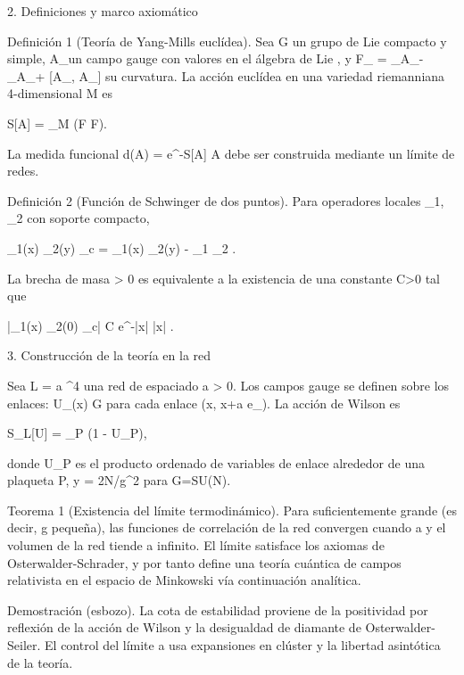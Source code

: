 \documentclass[12pt,a4paper]{book}
\begin{document}
2. Definiciones y marco axiomático

Definición 1 (Teoría de Yang-Mills euclídea). Sea G un grupo de Lie compacto y simple, A_\mu un campo gauge con valores en el álgebra de Lie , y F_{\mu\nu} = \partial_\mu A_\nu - \partial_\nu A_\mu + [A_\mu, A_\nu] su curvatura. La acción euclídea en una variedad riemanniana 4-dimensional M es

S[A] =  \int_M (F \wedge *F).

La medida funcional d\mu(A) = e^{-S[A]} A debe ser construida mediante un límite de redes.

Definición 2 (Función de Schwinger de dos puntos). Para operadores locales _1, _2 con soporte compacto,

\langle {}_1(x) _2(y) \rangle_c = \langle {}_1(x) _2(y) \rangle - \langle {}_1 \rangle \langle {}_2 \rangle.

La brecha de masa \Delta > 0 es equivalente a la existencia de una constante C>0 tal que

|\langle {}_1(x) _2(0) \rangle_c| \le C e^{-\Delta |x|} \quad {} |x| \to \infty.

3. Construcción de la teoría en la red

Sea L = a ^4 una red de espaciado a > 0. Los campos gauge se definen sobre los enlaces: U_\mu(x) \in G para cada enlace (x, x+a e_\mu). La acción de Wilson es

S_L[U] = \beta \sum_P  (1 - U_P),

donde U_P es el producto ordenado de variables de enlace alrededor de una plaqueta P, y \beta = 2N/g^2 para G=SU(N).

Teorema 1 (Existencia del límite termodinámico). Para \beta suficientemente grande (es decir, g pequeña), las funciones de correlación de la red convergen cuando a  y el volumen de la red tiende a infinito. El límite satisface los axiomas de Osterwalder-Schrader, y por tanto define una teoría cuántica de campos relativista en el espacio de Minkowski vía continuación analítica.

Demostración (esbozo). La cota de estabilidad proviene de la positividad por reflexión de la acción de Wilson y la desigualdad de diamante de Osterwalder-Seiler. El control del límite a  usa expansiones en clúster y la libertad asintótica de la teoría.
\end{document}
